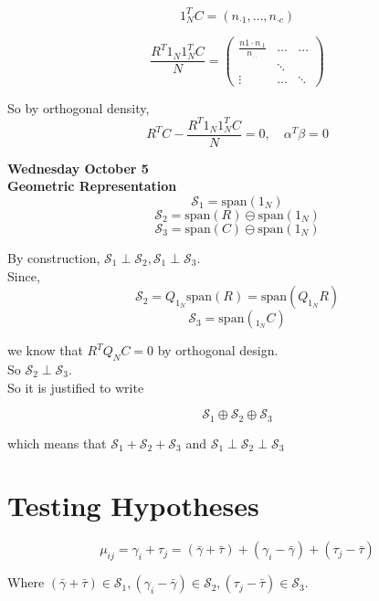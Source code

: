 \documentclass[11pt,fleqn]{book} %
\begin{document}
 		$$1^T_N C = (n_{\cdot 1}, \dots, n_{\cdot c}) $$


 		$$ \frac{R^T 1_N 1^T_N C }{N } = \begin{pmatrix}
 			\frac{n{1 \cdot} n_{\cdot 1}}{n_{\cdot \cdot}} & \dots & \dots \\
 			 & \ddots & \\
 			 \vdots & \dots & \ddots
 		\end{pmatrix}$$

So by orthogonal density, \\


		$$R^TC - \frac{R^T 1_N 1_N^T C}{N} = 0, \quad \alpha^T\beta = 0$$


\textbf{Wednesday October 5}\\

\textbf{Geometric Representation}\\

		$$\mathcal{S}_1 = \text{span}(1_N) $$
		$$\mathcal{S}_2 = \text{span}(R) \ominus \text{span}(1_N) $$
		$$\mathcal{S}_3 = \text{span}(C) \ominus \text{span}(1_N) $$

By construction, $\mathcal{S}_1 \perp \mathcal{S}_2, \mathcal{S}_1 \perp \mathcal{S}_3$.\\

Since, 	
		$$ \mathcal{S}_2 = Q_{1_N} \text{span}(R) = \text{span}(Q_{1_N} R) $$ 
		$$ \mathcal{S}_3 = \text{span}(_{1_N} C) $$

we know that $R^T Q_N C = 0$ by orthogonal design. \\

So $\mathcal{S}_2 \perp \mathcal{S}_3.$\\

So it is justified to write

		$$\mathcal{S}_1 \oplus \mathcal{S}_2 \oplus \mathcal{S}_3 $$

which means that $\mathcal{S}_1 + \mathcal{S}_2 + \mathcal{S}_3 $ and $\mathcal{S}_1 \perp \mathcal{S}_2 \perp \mathcal{S}_3 $


\section{Testing Hypotheses}


		$$\mu_{ij} = \gamma_i + \tau_j = (\bar{\gamma} + \bar{\tau}) + (\gamma_i - \bar{\gamma}) + (\tau_j - \bar{\tau})$$

Where $(\bar{\gamma} + \bar{\tau}) \in \mathcal{S}_1, (\gamma_i - \bar{\gamma}) \in \mathcal{S}_2, (\tau_j - \bar{\tau}) \in \mathcal{S}_3 $. 
\end{document}
